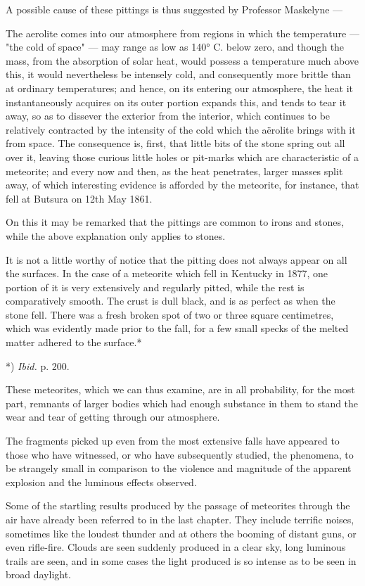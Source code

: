 \documentclass[a4paper, 12pt, oneside, polutonikogreek, english]{article}
\begin{document}
A possible cause of these pittings is thus suggested by Professor Maskelyne ---

The aerolite comes into our atmosphere from regions in which the temperature --- "the cold of space" --- may range as low as 140° C. below zero, and though the mass, from the absorption of solar heat, would possess a temperature much above this, it would nevertheless be intensely cold, and consequently more brittle than at ordinary temperatures; and hence, on its entering our atmosphere, the heat it instantaneously acquires on its outer portion expands this, and tends to tear it away, so as to dissever the exterior from the interior, which continues to be relatively contracted by the intensity of the cold which the aërolite brings with it from space. The consequence is, first, that little bits of the stone spring out all over it, leaving those curious little holes or pit-marks which are characteristic of a meteorite; and every now and then, as the heat penetrates, larger masses split away, of which interesting evidence is afforded by the meteorite, for instance, that fell at Butsura on 12th May 1861.

On this it may be remarked that the pittings are common to irons and stones, while the above explanation only applies to stones.

It is not a little worthy of notice that the pitting does not always appear on all the surfaces. In the case of a meteorite which fell in Kentucky in 1877, one portion of it is very extensively and regularly pitted, while the rest is comparatively smooth. The crust is dull black, and is as perfect as when the stone fell. There was a fresh broken spot of two or three square centimetres, which was evidently made prior to the fall, for a few small specks of the melted matter adhered to the surface.*

*) \emph{Ibid.} p. 200.

These meteorites, which we can thus examine, are in all probability, for the most part, remnants of larger bodies which had enough substance in them to stand the wear and tear of getting through our atmosphere.

The fragments picked up even from the most extensive falls have appeared to those who have witnessed, or who have subsequently studied, the phenomena, to be strangely small in comparison to the violence and magnitude of the apparent explosion and the luminous effects observed.

Some of the startling results produced by the passage of meteorites through the air have already been referred to in the last chapter. They include terrific noises, sometimes like the loudest thunder and at others the booming of distant guns, or even rifle-fire. Clouds are seen suddenly produced in a clear sky, long luminous trails are seen, and in some cases the light produced is so intense as to be seen in broad daylight.
\end{document}
